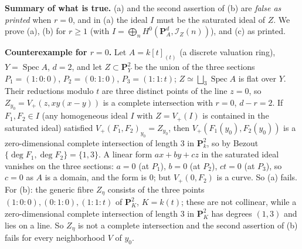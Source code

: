 \documentclass[11pt]{article}
\begin{document}
\pf
\textbf{Summary of what is true.} (a) and the second assertion of (b) are \emph{false as printed} when $r=0$, and in (a) the ideal $I$ must be the saturated ideal of $Z$. We prove (a), (b) for $r\ge1$ (with $I=\bigoplus_nH^0(\mathbf P^d_A,\mathcal I_Z(n))$), and (c) as printed.

\textbf{Counterexample for $r=0$.} Let $A=k[t]_{(t)}$ (a discrete valuation ring), $Y=\operatorname{Spec}A$, $d=2$, and let $Z\subset\mathbf P^2_Y$ be the union of the three sections $P_1=(1:0:0)$, $P_2=(0:1:0)$, $P_3=(1:1:t)$; $Z\simeq\bigsqcup_3\operatorname{Spec}A$ is flat over $Y$. Their reductions modulo $t$ are three distinct points of the line $z=0$, so $Z_{y_0}=V_+(z,xy(x-y))$ is a complete intersection with $r=0$, $d-r=2$. If $F_1,F_2\in I$ (any homogeneous ideal $I$ with $Z=V_+(I)$ is contained in the saturated ideal) satisfied $V_+(F_1,F_2)_{y_0}=Z_{y_0}$, then $V_+(F_1(y_0),F_2(y_0))$ is a zero-dimensional complete intersection of length $3$ in $\mathbf P^2_k$, so by Bezout $\{\deg F_1,\deg F_2\}=\{1,3\}$. A linear form $ax+by+cz$ in the saturated ideal vanishes on the three sections: $a=0$ (at $P_1$), $b=0$ (at $P_2$), $ct=0$ (at $P_3$), so $c=0$ as $A$ is a domain, and the form is $0$; but $V_+(0,F_2)$ is a curve. So (a) fails. For (b): the generic fibre $Z_\eta$ consists of the three points $(1:0:0),(0:1:0),(1:1:t)$ of $\mathbf P^2_K$, $K=k(t)$; these are not collinear, while a zero-dimensional complete intersection of length $3$ in $\mathbf P^2_K$ has degrees $(1,3)$ and lies on a line. So $Z_\eta$ is not a complete intersection and the second assertion of (b) fails for every neighborhood $V$ of $y_0$.
\end{document}
